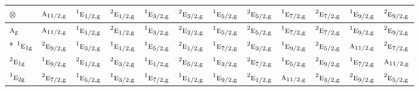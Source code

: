\documentclass[10pt,a4paper]{article}
\numberwithin{equation}{section}
\newcommand{\irr}[1]{\text{\normalfont\scshape #1}}
\newcommand{\conjpair}[1]{{}^{#1}}
\newcommand{\ptag}[1]{\mathrm{#1}}
\newcommand{\irrprod}{\otimes}
\begin{document}
{\small\setlength{\tabcolsep}{3pt}\begin{longtable}{@{}lccccccccccc@{}}\toprule
$\irrprod$ & $\irr{a}_{11/2,\ptag{g}}$ & $\conjpair{1}\irr{e}_{1/2,\ptag{g}}$ & $\conjpair{2}\irr{e}_{1/2,\ptag{g}}$ & $\conjpair{1}\irr{e}_{3/2,\ptag{g}}$ & $\conjpair{2}\irr{e}_{3/2,\ptag{g}}$ & $\conjpair{1}\irr{e}_{5/2,\ptag{g}}$ & $\conjpair{2}\irr{e}_{5/2,\ptag{g}}$ & $\conjpair{1}\irr{e}_{7/2,\ptag{g}}$ & $\conjpair{2}\irr{e}_{7/2,\ptag{g}}$ & $\conjpair{1}\irr{e}_{9/2,\ptag{g}}$ & $\conjpair{2}\irr{e}_{9/2,\ptag{g}}$\\\midrule\endhead
\bottomrule\endfoot\endlastfoot
$\irr{a}_{\ptag{g}}$ & $\irr{a}_{11/2,\ptag{g}}$ & $\conjpair{1}\irr{e}_{1/2,\ptag{g}}$ & $\conjpair{2}\irr{e}_{1/2,\ptag{g}}$ & $\conjpair{1}\irr{e}_{3/2,\ptag{g}}$ & $\conjpair{2}\irr{e}_{3/2,\ptag{g}}$ & $\conjpair{1}\irr{e}_{5/2,\ptag{g}}$ & $\conjpair{2}\irr{e}_{5/2,\ptag{g}}$ & $\conjpair{1}\irr{e}_{7/2,\ptag{g}}$ & $\conjpair{2}\irr{e}_{7/2,\ptag{g}}$ & $\conjpair{1}\irr{e}_{9/2,\ptag{g}}$ & $\conjpair{2}\irr{e}_{9/2,\ptag{g}}$\\*
$\conjpair{1}\irr{e}_{1\ptag{g}}$ & $\conjpair{2}\irr{e}_{9/2,\ptag{g}}$ & $\conjpair{1}\irr{e}_{3/2,\ptag{g}}$ & $\conjpair{1}\irr{e}_{1/2,\ptag{g}}$ & $\conjpair{1}\irr{e}_{5/2,\ptag{g}}$ & $\conjpair{2}\irr{e}_{1/2,\ptag{g}}$ & $\conjpair{1}\irr{e}_{7/2,\ptag{g}}$ & $\conjpair{2}\irr{e}_{3/2,\ptag{g}}$ & $\conjpair{1}\irr{e}_{9/2,\ptag{g}}$ & $\conjpair{2}\irr{e}_{5/2,\ptag{g}}$ & $\irr{a}_{11/2,\ptag{g}}$ & $\conjpair{2}\irr{e}_{7/2,\ptag{g}}$\\
$\conjpair{2}\irr{e}_{1\ptag{g}}$ & $\conjpair{1}\irr{e}_{9/2,\ptag{g}}$ & $\conjpair{2}\irr{e}_{1/2,\ptag{g}}$ & $\conjpair{2}\irr{e}_{3/2,\ptag{g}}$ & $\conjpair{1}\irr{e}_{1/2,\ptag{g}}$ & $\conjpair{2}\irr{e}_{5/2,\ptag{g}}$ & $\conjpair{1}\irr{e}_{3/2,\ptag{g}}$ & $\conjpair{2}\irr{e}_{7/2,\ptag{g}}$ & $\conjpair{1}\irr{e}_{5/2,\ptag{g}}$ & $\conjpair{2}\irr{e}_{9/2,\ptag{g}}$ & $\conjpair{1}\irr{e}_{7/2,\ptag{g}}$ & $\irr{a}_{11/2,\ptag{g}}$\\
$\conjpair{1}\irr{e}_{2\ptag{g}}$ & $\conjpair{2}\irr{e}_{7/2,\ptag{g}}$ & $\conjpair{1}\irr{e}_{5/2,\ptag{g}}$ & $\conjpair{1}\irr{e}_{3/2,\ptag{g}}$ & $\conjpair{1}\irr{e}_{7/2,\ptag{g}}$ & $\conjpair{1}\irr{e}_{1/2,\ptag{g}}$ & $\conjpair{1}\irr{e}_{9/2,\ptag{g}}$ & $\conjpair{2}\irr{e}_{1/2,\ptag{g}}$ & $\irr{a}_{11/2,\ptag{g}}$ & $\conjpair{2}\irr{e}_{3/2,\ptag{g}}$ & $\conjpair{2}\irr{e}_{9/2,\ptag{g}}$ & $\conjpair{2}\irr{e}_{5/2,\ptag{g}}$\\

\end{longtable}}
\end{document}
